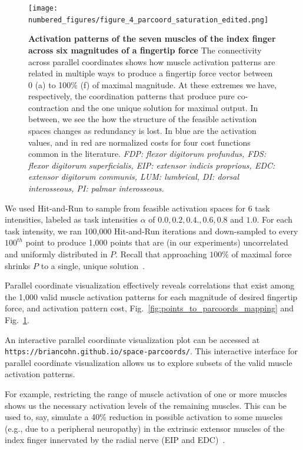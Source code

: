 \documentclass[9pt,twocolumn,twoside,lineno]{pnas-new}
\begin{document}
\begin{figure}[htbp]
 \centering
 \texttt{[image: numbered\_figures/figure\_4\_parcoord\_saturation\_edited.png]}
 \caption{\textbf{Activation patterns of the seven muscles of the index finger across six magnitudes of a fingertip force} The connectivity across parallel coordinates shows how muscle activation patterns are related in multiple ways to produce a fingertip force vector between 0 (a) to 100\% (f) of maximal magnitude. At these extremes we have, respectively, the coordination patterns that produce pure co-contraction and the one unique solution for maximal output. In between, we see the how the structure of the feasible activation spaces changes as redundancy is lost. In blue are the activation values, and in red are normalized costs for four cost functions common in the literature. \textit{FDP: flexor digitorum profundus, FDS: flexor digitorum superficialis, EIP: extensor indicis proprious, EDC: extensor digitorum communis, LUM: lumbrical, DI: dorsal interosseous, PI: palmar interosseous.}}
 \label{fig:figure_4_parcoord}
\end{figure}

We used Hit-and-Run to sample from feasible activation spaces for 6 task intensities, labeled as task intensities $\alpha$ of $0.0, 0.2, 0.4., 0.6, 0.8$ and $1.0$.
For each task intensity, we ran 100,000 Hit-and-Run iterations and down-sampled to every $100^{th}$ point to produce 1,000 points that are (in our experiments) uncorrelated and uniformly distributed in $P$.
Recall that approaching $100\%$ of maximal force shrinks $P$ to a single, unique solution~\cite{Valero-Cuevas1998Large
}.




Parallel coordinate visualization effectively reveals correlations that exist among the 1,000 valid muscle activation patterns for each magnitude of desired fingertip force, and activation pattern cost, Fig.~\ref{fig:points_to_parcoords_mapping} and Fig.~\ref{fig:figure_4_parcoord}.


An interactive parallel coordinate visualization plot can be accessed at \texttt{https://briancohn.github.io/space-parcoords/}. This interactive interface for parallel coordinate visualization allows us to explore subsets of the valid muscle activation patterns.

For example, restricting the range of muscle activation of one or more muscles shows us the necessary activation levels of the remaining muscles.
This can be used to, say, simulate a 40\% reduction in possible activation to some muscles (e.g., due to a peripheral neuropathy) in the extrinsic extensor muscles of the index finger innervated by the radial nerve (EIP and EDC)~\cite{valero2000quantification}.
\end{document}
